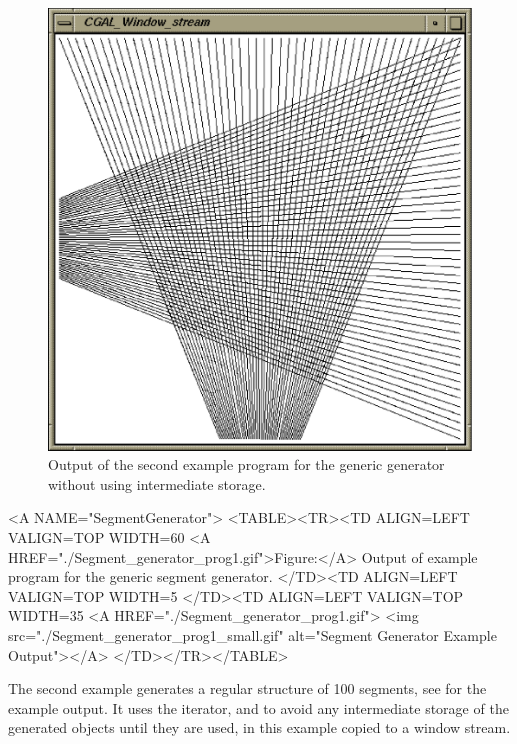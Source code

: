 \begin{ccTexOnly}
\begin{figure}
\begin{minipage}[t]{0.45\textwidth}
      \includegraphics[width=\textwidth]{Segment_generator_prog2.ps}
      \caption{Output of the second example program for the generic
        generator without using intermediate storage.}
      \label{figureSegmentGeneratorFan}
    \end{minipage}%
  \end{figure}
\end{ccTexOnly}


\begin{ccHtmlOnly}
  <A NAME="SegmentGenerator">
  <TABLE><TR><TD ALIGN=LEFT VALIGN=TOP WIDTH=60%
    <A HREF="./Segment_generator_prog1.gif">Figure:</A>
    Output of example program for the generic segment generator.
  </TD><TD ALIGN=LEFT VALIGN=TOP WIDTH=5%
  </TD><TD ALIGN=LEFT VALIGN=TOP WIDTH=35%
    <A HREF="./Segment_generator_prog1.gif">
        <img src="./Segment_generator_prog1_small.gif" 
             alt="Segment Generator Example Output"></A>
  </TD></TR></TABLE>
\end{ccHtmlOnly}

The second example generates a regular structure of 100 segments, see 
 for the example
output. It uses the  iterator,
 and  to
avoid any intermediate storage of the generated objects until they are
used, in this example copied to a window stream.


